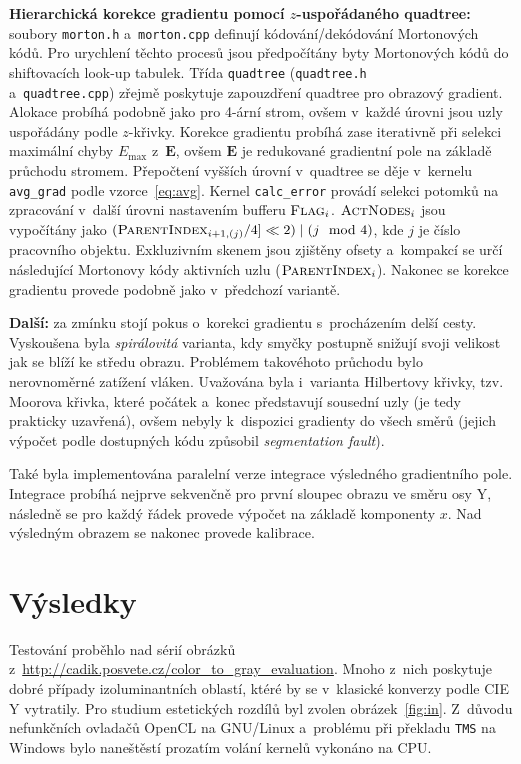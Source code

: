 \documentclass[11pt,a4paper,oneside]{article}
\begin{document}
	\textbf{Hierarchická korekce gradientu pomocí $z$-uspořádaného quadtree:} \;
	soubory \texttt{morton.h} a~\texttt{morton.cpp} definují kódování/dekódování Mortonových kódů.
	Pro urychlení těchto procesů jsou předpočítány byty Mortonových kódů do shiftovacích look-up
	tabulek. Třída \texttt{quadtree} (\texttt{quadtree.h} \\ a~\texttt{quadtree.cpp})
	zřejmě poskytuje zapouzdření quadtree pro obrazový gradient. Alokace probíhá podobně jako pro 4-ární
	strom, ovšem v~každé úrovni jsou uzly uspořádány podle $z$-křivky. Korekce gradientu
	probíhá zase iterativně při selekci maximální chyby $E_{\max}$ z~$\textbf{E}$, ovšem
	$\textbf{E}$ je redukované gradientní pole na základě průchodu stromem. Přepočtení vyšších
	úrovní v~quadtree se děje v~kernelu \texttt{avg\_grad} podle vzorce~\eqref{eq:avg}.
	Kernel \texttt{calc\_error} provádí selekci potomků na zpracování v~další úrovni
	nastavením bufferu $\textsc{Flag}_i$. $\textsc{ActNodes}_i$ jsou vypočítány jako
	$ (\textsc{ParentIndex}_{i + 1, (j)} / 4] \ll 2) \mid (j \mod 4)$, kde $j$ je číslo
	pracovního objektu. Exkluzivním skenem jsou zjištěny ofsety a~kompakcí se určí následující
	Mortonovy kódy aktivních uzlu ($\textsc{ParentIndex}_i$). Nakonec se korekce gradientu provede
	podobně jako v~předchozí variantě.

	\textbf{Další:} \; za zmínku stojí pokus o~korekci gradientu s~procházením delší cesty.
	Vyskoušena byla \emph{spirálovitá} varianta, kdy smyčky postupně snižují svoji velikost
	jak se blíží ke středu obrazu. Problémem takovéhoto průchodu bylo nerovnoměrné zatížení vláken.
	Uvažována byla i~varianta Hilbertovy křivky, tzv. Moorova křivka, které počátek a~konec
	představují sousední uzly (je tedy prakticky uzavřená), ovšem nebyly k~dispozici gradienty
	do všech směrů (jejich výpočet podle dostupných kódu způsobil \emph{segmentation fault}).

	Také byla implementována paralelní verze integrace výsledného gradientního pole. Integrace
	probíhá nejprve sekvenčně pro první sloupec obrazu ve směru osy Y, následně se pro
	každý řádek provede výpočet na základě komponenty $x$. Nad výsledným obrazem
	se nakonec provede kalibrace.

	\section{Výsledky}
	Testování proběhlo nad sérií obrázků z~\url{http://cadik.posvete.cz/color_to_gray_evaluation}.
	Mnoho z~nich poskytuje dobré případy izoluminantních oblastí, ktéré by se v~klasické konverzy
	podle CIE Y vytratily. Pro studium estetických rozdílů byl zvolen obrázek~\ref{fig:in}.
	Z~důvodu nefunkčních ovladačů OpenCL na GNU/Linux a~problému při překladu \texttt{TMS}
	na Windows bylo naneštěstí prozatím volání kernelů vykonáno na CPU.
\end{document}
